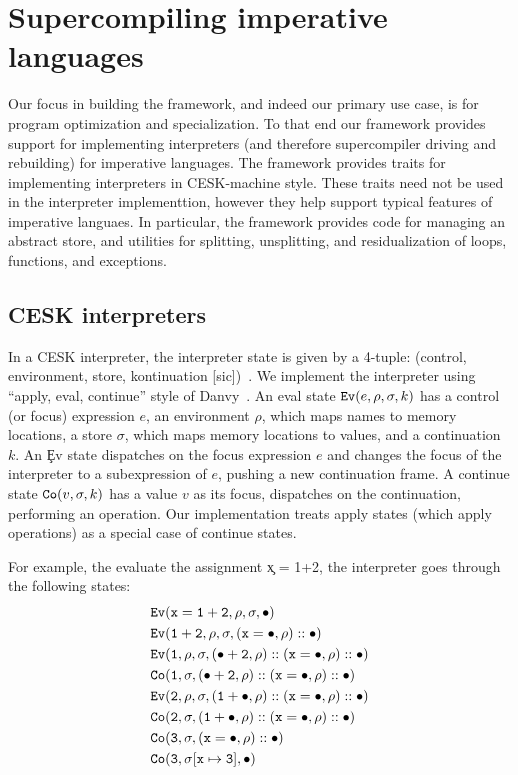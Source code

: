 \section{Supercompiling imperative languages}

Our focus in building the framework, and indeed our primary use case,
is for program optimization and specialization.
To that end our framework provides support for 
implementing interpreters (and therefore supercompiler
driving and rebuilding) for imperative languages.
The framework provides traits for implementing interpreters
in CESK-machine style. 
These traits need not be used in the interpreter implementtion,
however they help support
typical features of imperative languaes.
In particular, the framework provides code for managing an abstract store,
and utilities for 
splitting, unsplitting, and
residualization of loops, functions, and exceptions.

\subsection{CESK interpreters}

In a CESK interpreter, the interpreter state is given by a 4-tuple:
(control, environment, store, kontinuation [sic])~\cite{cesk}.
We implement the interpreter using
``apply, eval, continue'' style of Danvy~\cite{danvy}.
An eval state $\c{Ev}(e, \rho, \sigma, k)$
has a control (or focus) expression $e$, an environment $\rho$,
which maps names to memory locations, a store $\sigma$, which maps
memory locations to values, and a continuation $k$.
An \c{Ev} state
dispatches on the focus expression $e$ and
changes the focus of the interpreter to a subexpression of $e$, pushing a new continuation frame.
A continue state $\c{Co}(v, \sigma, k)$
has a value $v$ as its focus, dispatches on the continuation, performing an
operation. 
Our implementation treats apply states (which apply operations)
as a special case of continue states.

For example, the evaluate the assignment \c{x = 1+2}, the interpreter goes through the following
states:
\begin{align*}
& \c{Ev}(\c{x = 1+2}, \rho, \sigma, \bullet) \\ 
& \c{Ev}(\c{1+2}, \rho, \sigma, (\c{x = \bullet},\rho)::\bullet) \\
& \c{Ev}(\c{1}, \rho, \sigma, (\c{\bullet+2},\rho)::(\c{x = \bullet},\rho)::\bullet) \\
& \c{Co}(\c{1}, \sigma, (\c{\bullet+2},\rho)::(\c{x = \bullet},\rho)::\bullet) \\
& \c{Ev}(\c{2}, \rho, \sigma, (\c{1+\bullet},\rho)::(\c{x = \bullet},\rho)::\bullet) \\
& \c{Co}(\c{2}, \sigma, (\c{1+\bullet},\rho)::(\c{x = \bullet},\rho)::\bullet) \\
& \c{Co}(\c{3}, \sigma, (\c{x = \bullet},\rho)::\bullet) \\
& \c{Co}(\c{3}, \sigma[\c{x}\mapsto\c{3}], \bullet)
\end{align*}

